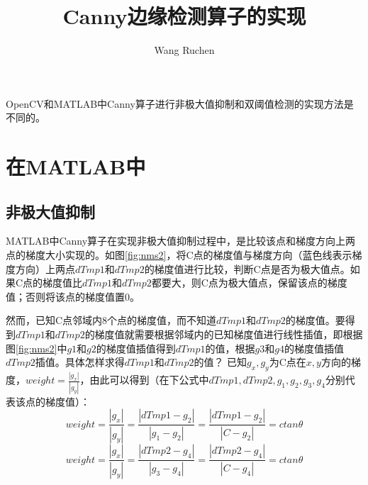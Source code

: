\documentclass[12pt]{article}
\begin{document}
\title{\vspace{-2em}Canny边缘检测算子的实现\vspace{-0.7em}}
\author{Wang Ruchen}
\maketitle\thispagestyle{fancy}
\maketitle
OpenCV和MATLAB中Canny算子进行非极大值抑制和双阈值检测的实现方法是不同的。

\section{在MATLAB中}

\subsection{非极大值抑制}
MATLAB中Canny算子在实现非极大值抑制过程中，是比较该点和梯度方向上两点的梯度大小实现的。如图\ref{fig:nms2}，将C点的梯度值与梯度方向（蓝色线表示梯度方向）上两点$dTmp1$和$dTmp2$的梯度值进行比较，判断C点是否为极大值点。如果C点的梯度值比$dTmp1$和$dTmp2$都要大，则C点为极大值点，保留该点的梯度值；否则将该点的梯度值置0。

然而，已知C点邻域内8个点的梯度值，而不知道$dTmp1$和$dTmp2$的梯度值。要得到$dTmp1$和$dTmp2$的梯度值就需要根据邻域内的已知梯度值进行线性插值，即根据图\ref{fig:nms2}中$g1$和$g2$的梯度值插值得到$dTmp1$的值，根据$g3$和$g4$的梯度值插值$dTmp2$插值。具体怎样求得$dTmp1$和$dTmp2$的值？
已知$g_{x},g_{y}$为C点在$x,y$方向的梯度，$weight=\frac{|g_{x}|}{|g_{y}|}$，由此可以得到（在下公式中$dTmp1,dTmp2,g_{1},g_{2},g_{3},g_{4}$分别代表该点的梯度值）：
    \begin{equation}
      weight=\frac{|g_{x}|}{|g_{y}|}=\frac{|dTmp1-g_{2}|}{|g_{1}-g_{2}|}
      =\frac{|dTmp1-g_{2}|}{|C-g_{2}|}=ctan\theta
      \end{equation}
      \begin{equation}
      weight=\frac{|g_{x}|}{|g_{y}|}=\frac{|dTmp2-g_{4}|}{|g_{3}-g_{4}|}
      =\frac{|dTmp2-g_{4}|}{|C-g_{4}|}=ctan\theta
    \end{equation}
\end{document}
